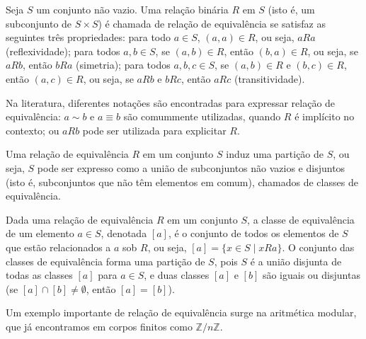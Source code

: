 \begin{definition}
Seja $S$ um conjunto não vazio. Uma relação binária $R$ em $S$
(isto é, um subconjunto de $S \times S$) é chamada de relação de equivalência
se satisfaz as seguintes três propriedades:
para todo $a \in S$, $(a, a) \in R$, ou seja, $a R a$ (reflexividade);
para todos $a, b \in S$, se $(a, b) \in R$, então $(b, a) \in R$, ou seja, se $a R b$, então $b R a$ (simetria);
para todos $a, b, c \in S$, se $(a, b) \in R$ e $(b, c) \in R$, então $(a, c) \in R$, ou seja, se $a R b$ e $b R c$, então $a R c$ (transitividade).
\end{definition}

Na literatura, diferentes notações são encontradas para expressar relação
de equivalência: $a \sim b$ e $a \equiv b$ são comummente utilizadas, quando
$R$ é implícito no contexto; ou $a R b$ pode ser utilizada para explicitar $R$.

Uma relação de equivalência $R$ em um conjunto $S$ induz uma partição de $S$,
ou seja, $S$ pode ser expresso como a união de subconjuntos não vazios e disjuntos
(isto é, subconjuntos que não têm elementos em comum), chamados de classes de equivalência.

\begin{definition}
Dada uma relação de equivalência $R$ em um conjunto $S$, a classe de equivalência
de um elemento $a \in S$, denotada $[a]$, é o conjunto de todos os elementos de $S$
que estão relacionados a $a$ sob $R$, ou seja, $[a] = \{ x \in S \mid x R a \}$.
O conjunto das classes de equivalência forma uma partição de $S$, pois $S$ é a
união disjunta de todas as classes $[a]$ para $a \in S$, e duas classes $[a]$ e
$[b]$ são iguais ou disjuntas (se $[a] \cap [b] \neq \emptyset$, então $[a] = [b]$).
\end{definition}

Um exemplo importante de relação de equivalência surge na aritmética modular,
que já encontramos em corpos finitos como $\mathbb{Z}/n\mathbb{Z}$.

